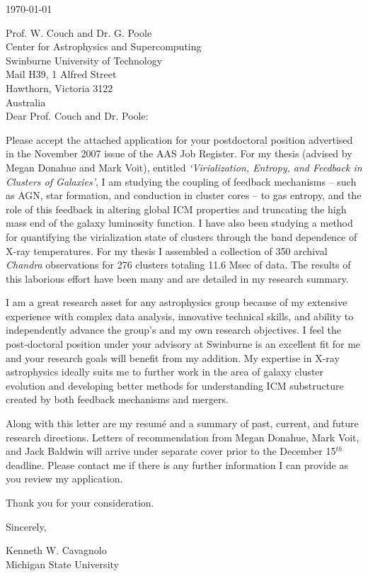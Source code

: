 \documentclass[11pt]{article}
\begin{document}
\today

Prof. W. Couch and Dr. G. Poole\\
Center for Astrophysics and Supercomputing\\
Swinburne University of Technology\\
Mail H39, 1 Alfred Street\\
Hawthorn, Victoria 3122\\
Australia\\

Dear Prof. Couch and Dr. Poole:

Please accept the attached application for your postdoctoral
position advertised in the November 2007 issue of the AAS Job
Register. For my thesis (advised by Megan Donahue and  Mark Voit),
entitled {\it `Virialization, Entropy, and Feedback in Clusters of
Galaxies'}, I am studying the coupling of feedback mechanisms -- such
as AGN, star formation, and conduction in cluster cores -- to gas
entropy, and the role of this feedback in altering global ICM
properties and truncating the high mass end of the galaxy luminosity
function. I have also been studying a method for quantifying the
virialization state of clusters through the band dependence of X-ray
temperatures. For my thesis I assembled a collection of 350 archival
{\textit{Chandra}} observations for 276 clusters totaling 11.6 Msec of
data. The results of this laborious effort have been many and are
detailed in my research summary.

I am a great research asset for any astrophysics group because of my
extensive experience with complex data analysis, innovative technical
skills, and ability to independently advance the group's and my own
research objectives. I feel the post-doctoral position under your
advisory at Swinburne is an excellent fit for me and your research
goals will benefit from my addition. My expertise in X-ray
astrophysics ideally suits me to further work in the area of galaxy
cluster evolution and developing better methods for understanding ICM
substructure created by both feedback mechanisms and mergers.

Along with this letter are my resum\'{e} and a summary of past,
current, and future research directions. Letters of recommendation
from Megan Donahue, Mark Voit, and Jack Baldwin will arrive under
separate cover prior to the December 15$^{th}$ deadline. Please contact
me if there is any further information I can provide as you review my
application.

Thank you for your consideration.

Sincerely,\\
\begin{minipage}{7.5in}
\end{minipage}
Kenneth W. Cavagnolo\\
Michigan State University
\end{document}
